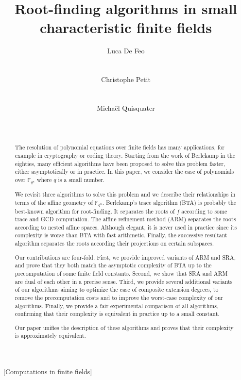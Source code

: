 \documentclass{sig-alternate}
\author{
  \alignauthor Luca De Feo\\
  \affaddr{Laboratoire PRiSM}\\
  \affaddr{Universit\'e de Versailles}\\
  \email{luca.de-feo@uvsq.fr}
  \alignauthor Christophe Petit\\
  \affaddr{Information Security Group}\\
  \affaddr{University College London}\\
  \email{}
  \alignauthor Micha\"el Quisquater\\
  \affaddr{Laboratoire PRiSM}\\
  \affaddr{Universit\'e de Versailles}\\
  \email{mquis@prism.uvsq.fr}
}
\title{Root-finding algorithms in small characteristic finite fields}
\newcommand{\ff}[1]{\mathbb{F}_{#1}}
\newcommand{\fqn}{\ff{q^n}}
\newcommand{\qq}{q}
\newcounter{algo}
\begin{document}
\maketitle
\begin{abstract}
  The resolution of polynomial equations over finite fields has many
  applications, for example in cryptography or coding theory. Starting
  from the work of Berlekamp in the eighties, many efficient
  algorithms have been proposed to solve this problem faster, either
  asymptotically or in practice.  In this paper, we consider the case
  of polynomials over $\fqn$ where $\qq$ is a small number. 
  
  We revisit three algorithms to solve this problem and we describe their relationships in terms of the affine geometry of $\fqn$.
Berlekamp's trace algorithm (BTA) is probably the best-known algorithm for root-finding. It separates the roots of $f$ according to some trace and GCD computation. The affine refinement method (ARM) separates the roots according to nested affine spaces. Although elegant, it is never used in practice since its complexity is worse than BTA with fast arithmetic. Finally, the successive resultant algorithm separates the roots according their projections on certain subspaces.

Our contributions are four-fold. First, we provide improved variants of ARM and SRA, and prove that they both match the asymptotic complexity of BTA up to the precomputation of some finite field constants.
 Second, we show that SRA and ARM are dual of each other in a precise sense.
 Third, we provide several additional variants of our algorithms aiming to optimize the case of composite extension degrees, to remove the precomputation costs and to improve the worst-case complexity of our algorithms.
 Finally, we provide a fair experimental comparison of all algorithms, confirming that their complexity is equivalent in practice up to  a small constant.
 
 Our paper unifies the description of these algorithms and proves that their complexity is approximately equivalent.
\end{abstract}

[Computations in finite fields]

\end{document}
